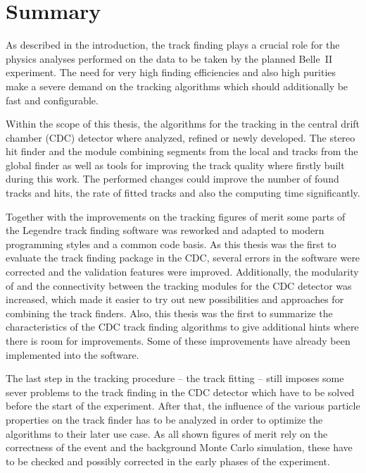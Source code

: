 \chapter*{Summary}

As described in the introduction, the track finding plays a crucial role for the physics analyses performed on the data to be taken by the planned Belle~II experiment. The need for very high finding efficiencies and also high purities make a severe demand on the tracking algorithms which should additionally be fast and configurable.

Within the scope of this thesis, the algorithms for the tracking in the central drift chamber (CDC) detector where analyzed, refined or newly developed. The stereo hit finder and the module combining segments from the local and tracks from the global finder as well as tools for improving the track quality where firstly built during this work. The performed changes could improve the number of found tracks and hits, the rate of fitted tracks and also the computing time significantly.

Together with the improvements on the tracking figures of merit some parts of the Legendre track finding software was reworked and adapted to modern programming styles and a common code basis. As this thesis was the first to evaluate the track finding package in the CDC, several errors in the software were corrected and the validation features were improved. Additionally, the modularity of and the connectivity between the tracking modules for the CDC detector was increased, which made it easier to try out new possibilities and approaches for combining the track finders. Also, this thesis was the first to summarize the characteristics of the CDC track finding algorithms to give additional hints where there is room for improvements. Some of these improvements have already been implemented into the software.

The last step in the tracking procedure -- the track fitting -- still imposes some sever problems to the track finding in the CDC detector which have to be solved before the start of the experiment. After that, the influence of the various particle properties on the track finder has to be analyzed in order to optimize the algorithms to their later use case. As all shown figures of merit rely on the correctness of the event and the background Monte Carlo simulation, these have to be checked and possibly corrected in the early phases of the experiment.

